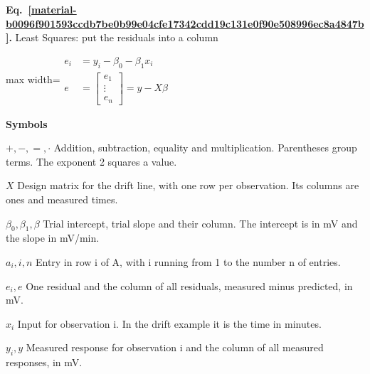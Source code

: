 \documentclass[11pt,a4paper]{article}
\begin{document}
\par\medskip
\noindent\begin{minipage}{\linewidth}
\label{material-b0096f901593ccdb7be0b99e04cfe17342cdd19c131e0f90e508996ec8a4847b}
\noindent\textbf{Eq.~\ref*{material-b0096f901593ccdb7be0b99e04cfe17342cdd19c131e0f90e508996ec8a4847b}.} Least Squares: put the residuals into a column\par\nopagebreak
\begin{center}\begin{adjustbox}{max width=\linewidth}$\displaystyle \begin{aligned}e_i&=y_i-\beta_0-\beta_1 x_i\\[.6em]e&=\begin{bmatrix}e_1\\ \vdots\\ e_n\end{bmatrix}=y-X\beta\end{aligned}$\end{adjustbox}\end{center}

\par\noindent\textbf{Symbols}

\par\noindent\textbf{\(+,-,=,\cdot\)} Addition, subtraction, equality and multiplication. Parentheses group terms. The exponent 2 squares a value.

\par\noindent\textbf{\(X\)} Design matrix for the drift line, with one row per observation. Its columns are ones and measured times.

\par\noindent\textbf{\(\beta_0,\beta_1,\beta\)} Trial intercept, trial slope and their column. The intercept is in mV and the slope in mV/min.

\par\noindent\textbf{\(a_i,i,n\)} Entry in row i of A, with i running from 1 to the number n of entries.

\par\noindent\textbf{\(e_i,e\)} One residual and the column of all residuals, measured minus predicted, in mV.

\par\noindent\textbf{\(x_i\)} Input for observation i. In the drift example it is the time in minutes.

\par\noindent\textbf{\(y_i,y\)} Measured response for observation i and the column of all measured responses, in mV.

\end{minipage}\par
\medskip
\end{document}
